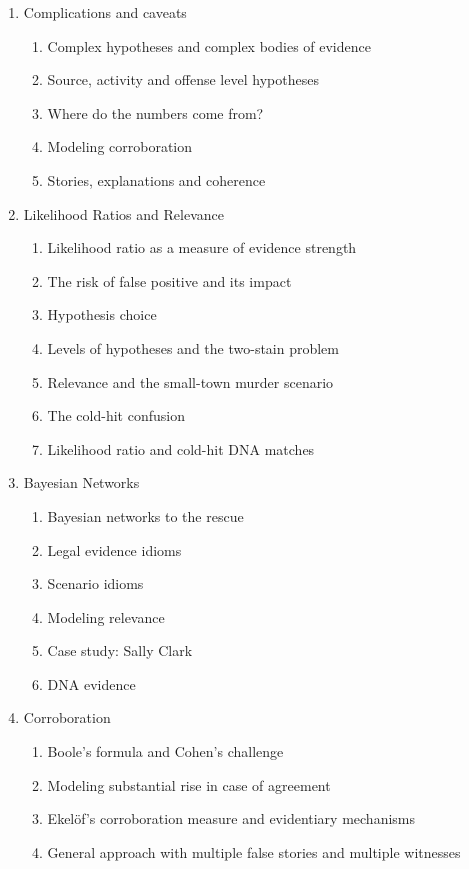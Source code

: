 \documentclass[11pt,dvipsnames,enabledeprecatedfontcommands]{scrartcl}
\begin{document}
\begin{multicols}{2}
\begin{enumerate}
\begin{enumerate}
  \item  Complications and caveats
  \begin{enumerate}
  \item  Complex hypotheses and complex bodies of evidence
  \item Source, activity and offense level hypotheses
  \item  Where do the numbers come from?
  \item  Modeling corroboration
  \item  Stories, explanations and coherence
  \end{enumerate}

  \item  Likelihood Ratios and Relevance
  \begin{enumerate}
  \item Likelihood ratio as a measure of evidence strength
  \item The risk of false positive and its impact
  \item Hypothesis choice
  \item Levels of hypotheses and the two-stain problem
  \item Relevance and the small-town murder scenario
  \item The cold-hit confusion
  \item  Likelihood ratio and  cold-hit DNA matches
  \end{enumerate}



  \item  Bayesian Networks
  \begin{enumerate}
  \item  Bayesian networks to the rescue
  \item  Legal evidence idioms
  \item Scenario idioms
  \item Modeling relevance
  \item  Case study: Sally Clark
  \item DNA evidence
  \end{enumerate}
  
  \item Corroboration
  \begin{enumerate}
  \item Boole's formula and Cohen's challenge
  \item  Modeling substantial rise in case of agreement
  \item Ekel\"of's corroboration measure and evidentiary mechanisms
  \item General approach with multiple false stories and multiple witnesses
  \end{enumerate}


\end{enumerate}
\end{enumerate}
\end{multicols}
\end{document}
